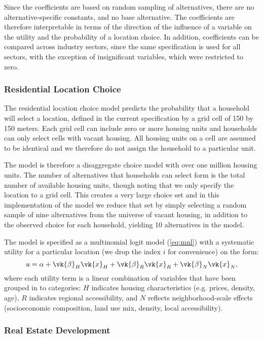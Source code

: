 Since the coefficients are based on random sampling of
alternatives, there are no alternative-specific constants, and no
base alternative. The coefficients are therefore interpretable in
terms of the direction of the influence of a variable on the
utility and the probability of a location choice. In addition,
coefficients can be compared across industry sectors, since the
same specification is used for all sectors, with the exception of
insignificant variables, which were restricted to zero.

\subsubsection{Residential Location Choice}

The residential location choice model predicts the probability
that a household will select a location, defined in the current
specification by a grid cell of 150 by 150 meters. Each grid cell
can include zero or more housing units and households can only
select cells with vacant housing. All housing units on a cell are
assumed to be identical and we therefore do not assign the
household to a particular unit.

The model is therefore a disaggregate choice model with over one
million housing units. The number of alternatives that households
can select form is the total number of available housing units,
though noting that we only specify the location to a grid cell.
This creates a very large choice set and in this implementation of
the model we reduce that set by simply selecting a random sample
of nine alternatives from the universe of vacant housing, in
addition to the observed choice for each household, yielding 10
alternatives in the model.

The model is specified as a multinomial logit model (\ref{eq:mnl})
with a systematic utility for a particular location (we drop the
index $i$ for convenience) on the form:
\begin{equation}
    u =  \alpha
     + \vk{\beta}_H \vk{x}_H
     + \vk{\beta}_R \vk{x}_R
     + \vk{\beta}_N \vk{x}_N,
    \label{eq:uresloc}
\end{equation}
where each utility term is a linear combination of variables that
have been grouped in to categories: $H$ indicates housing
characteristics (e.g. prices, density, age), $R$ indicates
regional accessibility, and $N$ reflects neighborhood-scale
effects (socioeconomic composition, land use mix, density, local
accessibility).

\subsubsection{Real Estate Development}

